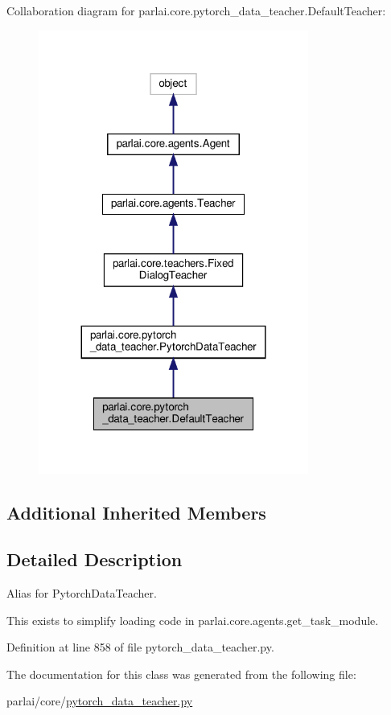 Collaboration diagram for parlai.\+core.\+pytorch\+\_\+data\+\_\+teacher.\+Default\+Teacher\+:
\nopagebreak
\begin{figure}[H]
\begin{center}
\leavevmode
\includegraphics[width=251pt]{d9/df5/classparlai_1_1core_1_1pytorch__data__teacher_1_1DefaultTeacher__coll__graph}
\end{center}
\end{figure}
\subsection*{Additional Inherited Members}


\subsection{Detailed Description}
\begin{DoxyVerb}Alias for PytorchDataTeacher.

This exists to simplify loading code in parlai.core.agents.get_task_module.
\end{DoxyVerb}
 

Definition at line 858 of file pytorch\+\_\+data\+\_\+teacher.\+py.



The documentation for this class was generated from the following file\+:\begin{DoxyCompactItemize}
\item 
parlai/core/\hyperlink{pytorch__data__teacher_8py}{pytorch\+\_\+data\+\_\+teacher.\+py}\end{DoxyCompactItemize}
